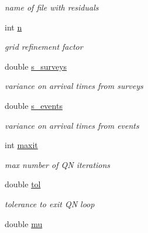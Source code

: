 \begin{DoxyCompactItemize}
\begin{DoxyCompactList}\small\item\em name of file with residuals \end{DoxyCompactList}\item 
\hypertarget{class_parameters_a00253c8b1546d94fe3b897c1187e30af}{}int \hyperlink{class_parameters_a00253c8b1546d94fe3b897c1187e30af}{n}\label{class_parameters_a00253c8b1546d94fe3b897c1187e30af}

\begin{DoxyCompactList}\small\item\em grid refinement factor \end{DoxyCompactList}\item 
\hypertarget{class_parameters_a877a21e7ec0f9ce1ed77fda9e2bead27}{}double \hyperlink{class_parameters_a877a21e7ec0f9ce1ed77fda9e2bead27}{s\+\_\+surveys}\label{class_parameters_a877a21e7ec0f9ce1ed77fda9e2bead27}

\begin{DoxyCompactList}\small\item\em variance on arrival times from surveys \end{DoxyCompactList}\item 
\hypertarget{class_parameters_a2aabd7d4c432c067c87446c430b0b137}{}double \hyperlink{class_parameters_a2aabd7d4c432c067c87446c430b0b137}{s\+\_\+events}\label{class_parameters_a2aabd7d4c432c067c87446c430b0b137}

\begin{DoxyCompactList}\small\item\em variance on arrival times from events \end{DoxyCompactList}\item 
\hypertarget{class_parameters_a1a66d61a5f2afd737ea2cbc0c74e9358}{}int \hyperlink{class_parameters_a1a66d61a5f2afd737ea2cbc0c74e9358}{maxit}\label{class_parameters_a1a66d61a5f2afd737ea2cbc0c74e9358}

\begin{DoxyCompactList}\small\item\em max number of Q\+N iterations \end{DoxyCompactList}\item 
\hypertarget{class_parameters_acfd7724d13974a7319efffe6c06002bc}{}double \hyperlink{class_parameters_acfd7724d13974a7319efffe6c06002bc}{tol}\label{class_parameters_acfd7724d13974a7319efffe6c06002bc}

\begin{DoxyCompactList}\small\item\em tolerance to exit Q\+N loop \end{DoxyCompactList}\item 
\hypertarget{class_parameters_a9af1dadb296181402dd7e912627c516b}{}double \hyperlink{class_parameters_a9af1dadb296181402dd7e912627c516b}{mu}\label{class_parameters_a9af1dadb296181402dd7e912627c516b}


\end{DoxyCompactItemize}

